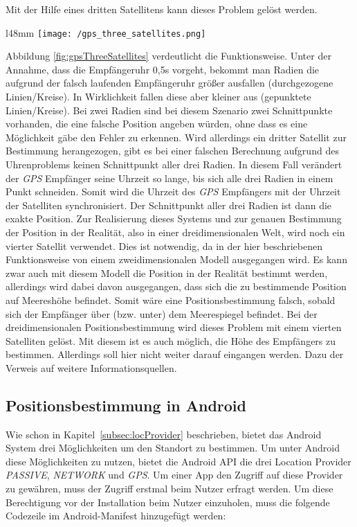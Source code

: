 Mit der Hilfe eines dritten Satellitens kann dieses Problem gelöst werden. 
\begin{wrapfigure}{l}{48mm}
	\centering
	\texttt{[image: /gps\_three\_satellites.png]}
	\caption[Lokalisierung: GPS 3 Satelliten]{GPS 3 Satellites}
	\label{fig:gpsThreeSatellites}
\end{wrapfigure}
Abbildung \ref{fig:gpsThreeSatellites} verdeutlicht die Funktionsweise. Unter der Annahme, dass die Empfängeruhr 0,5s vorgeht, bekommt man Radien die aufgrund der falsch laufenden Empfängeruhr größer ausfallen (durchgezogene Linien/Kreise). In Wirklichkeit fallen diese aber kleiner aus (gepunktete Linien/Kreise). Bei zwei Radien sind bei diesem Szenario zwei Schnittpunkte vorhanden, die eine falsche Position angeben würden, ohne dass es eine Möglichkeit gäbe den Fehler zu erkennen. Wird allerdings ein dritter Satellit zur Bestimmung herangezogen, gibt es bei einer falschen Berechnung aufgrund des Uhrenproblems keinen Schnittpunkt aller drei Radien. In diesem Fall verändert der \textit{GPS} Empfänger seine Uhrzeit so lange, bis sich alle drei Radien in einem Punkt schneiden. Somit wird die Uhrzeit des \textit{GPS} Empfängers mit der Uhrzeit der Satelliten synchronisiert. Der Schnittpunkt aller drei Radien ist dann die exakte Position.
Zur Realisierung dieses Systems und zur genauen Bestimmung der Position in der Realität, also in einer dreidimensionalen Welt, wird noch ein vierter Satellit verwendet. Dies ist notwendig, da in der hier beschriebenen Funktionsweise von einem zweidimensionalen Modell ausgegangen wird. Es kann zwar auch mit diesem Modell die Position in der Realität bestimmt werden, allerdings wird dabei davon ausgegangen, dass sich die zu bestimmende Position auf Meereshöhe befindet. Somit wäre eine Positionsbestimmung falsch, sobald sich der Empfänger über (bzw. unter) dem Meerespiegel befindet.
Bei der dreidimensionalen Positionsbestimmung wird dieses Problem mit einem vierten Satelliten gelöst. Mit diesem ist es auch möglich, die Höhe des Empfängers zu bestimmen. Allerdings soll hier nicht weiter darauf eingangen werden. Dazu der Verweis auf weitere Informationsquellen.

\subsection{Positionsbestimmung in Android}\label{subsec:posInAndroid}

Wie schon in Kapitel~\ref{subsec:locProvider} beschrieben, bietet das Android System drei Möglichkeiten um den Standort zu bestimmen. Um unter Android diese Möglichkeiten zu nutzen, bietet die Android API die drei Location Provider \textit{PASSIVE}, \textit{NETWORK} und \textit{GPS}.
Um einer App den Zugriff auf diese Provider zu gewähren, muss der Zugriff erstmal beim Nutzer erfragt werden. Um diese Berechtigung vor der Installation beim Nutzer einzuholen, muss die folgende Codezeile im Android-Manifest hinzugefügt werden:


